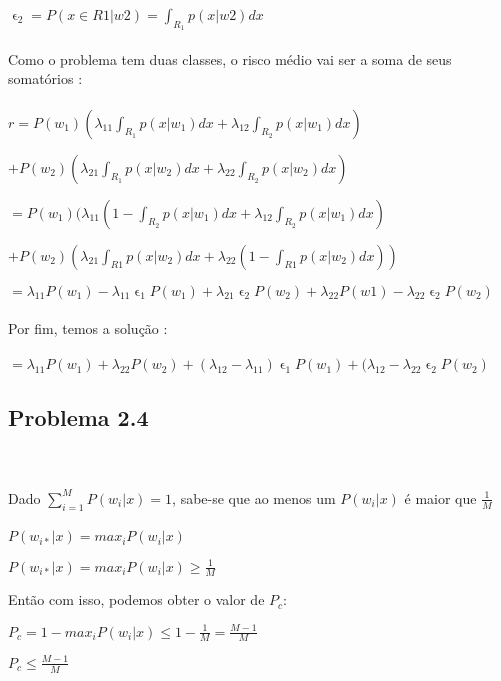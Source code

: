 \documentclass[a4paper, 12pt]{article}
\begin{document}
$\upvarepsilon_2 = P(x \in R1|w2) = \int_{R_1} p(x|w2)dx$
\\ \\
Como o problema tem duas classes, o risco médio vai ser a soma de seus somatórios :
\\ \\
$r = P(w_1) (\lambda_{11} \int_{R_1} p(x|w_1)dx + \lambda_{12} \int_{R_2} p(x|w_1)dx) $

$+  P(w_2) (\lambda_{21} \int_{R_1} p(x|w_2)dx + \lambda_{22} \int_{R_2} p(x|w_2)dx)$


$ = P(w_1)(\lambda_{11}(1- \int_{R_2} p(x|w_1)dx + \lambda_{12} \int_{R_2} p(x|w_1)dx)$

$+ P(w_2) (\lambda_{21} \int_{R1} p(x|w_2)dx + \lambda_{22} (1- \int_{R1} p(x|w_2)dx))$

$= \lambda_{11}P(w_1) - \lambda_{11}\upvarepsilon_1 P(w_1) + \lambda_{21}\upvarepsilon_2 P(w_2) + \lambda_{22}P(w1) - \lambda_{22}\upvarepsilon_2 P(w_2)$
\\ \\
Por fim, temos a solução :
\\ \\
$ = \lambda_{11}P(w_1) + \lambda_{22}P(w_2) + (\lambda_{12}-\lambda_{11})\upvarepsilon_1 P(w_1) + (\lambda_{12}-\lambda_{22}\upvarepsilon_2 P(w_2)$

\subsection{Problema 2.4}
\\ \\
Dado $\sum_{i=1}^M P(w_i|x) = 1$, sabe-se que ao menos um $P(w_i|x)$ é maior que $\frac{1}{M}$
\\ \\
$P(w_{i*} | x) = max_i P(w_i|x)$

$P(w_{i*} | x) = max_i P(w_i|x) \geq \frac{1}{M}$

Então com isso, podemos obter o valor de $P_c$:

$P_c = 1 - max_i P(w_i|x) \leq 1 - \frac{1}{M} = \frac{M-1}{M}$

$P_c \leq \frac{M-1}{M} $
\end{document}
